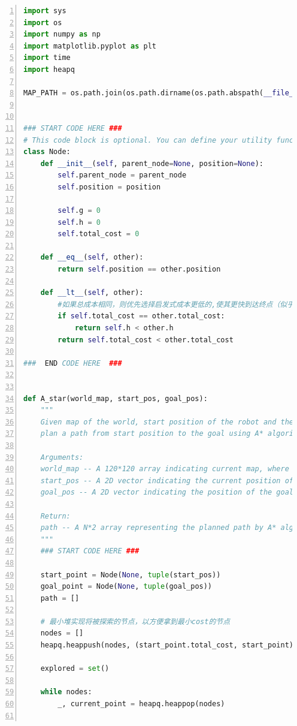 \documentclass[aps,letterpaper,10pt]{revtex4}
\begin{document}
\begin{lstlisting}[language=Python, caption={Source Code for Task 1 (5-Task\_1.py)}, label={lst:task1_code}, basicstyle=\ttfamily\small, numbers=left, frame=tb, breaklines=true]
import sys
import os
import numpy as np
import matplotlib.pyplot as plt
import time
import heapq

MAP_PATH = os.path.join(os.path.dirname(os.path.abspath(__file__)), '3-map/map.npy')


### START CODE HERE ###
# This code block is optional. You can define your utility function and class in this block if necessary.
class Node:
    def __init__(self, parent_node=None, position=None):
        self.parent_node = parent_node
        self.position = position

        self.g = 0
        self.h = 0
        self.total_cost = 0

    def __eq__(self, other):
        return self.position == other.position
    
    def __lt__(self, other):
        #如果总成本相同，则优先选择启发式成本更低的,使其更快到达终点（似乎加了这两行会减少锯齿，使得路径更平滑，但同时也会变慢）
        if self.total_cost == other.total_cost:
            return self.h < other.h
        return self.total_cost < other.total_cost

###  END CODE HERE  ###


def A_star(world_map, start_pos, goal_pos):
    """
    Given map of the world, start position of the robot and the position of the goal, 
    plan a path from start position to the goal using A* algorithm.

    Arguments:
    world_map -- A 120*120 array indicating current map, where 0 indicating traversable and 1 indicating obstacles.
    start_pos -- A 2D vector indicating the current position of the robot.
    goal_pos -- A 2D vector indicating the position of the goal.

    Return:
    path -- A N*2 array representing the planned path by A* algorithm.
    """
    ### START CODE HERE ###
    
    start_point = Node(None, tuple(start_pos))
    goal_point = Node(None, tuple(goal_pos))
    path = []
    
    # 最小堆实现将被探索的节点，以方便拿到最小cost的节点
    nodes = []
    heapq.heappush(nodes, (start_point.total_cost, start_point))
    
    explored = set()
    
    while nodes:
        _, current_point = heapq.heappop(nodes)
        

\end{lstlisting}
\end{document}
